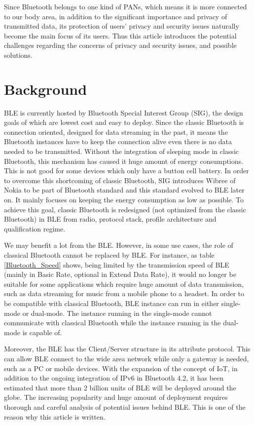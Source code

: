 \documentclass{cseminar}
\begin{document}
Since Bluetooth belongs to one kind of PANs, which means it is more connected to our body area, in addition to the significant importance and privacy of transmitted data, its protection of users' privacy and security issues naturally become the main focus of its users. Thus this article introduces the potential challenges regarding the concerns of privacy and security issues, and possible solutions.


\section{Background}
BLE is currently hosted by Bluetooth Special Interest Group (SIG), the design goals of which are lowest cost and easy to deploy. Since the classic Bluetooth is connection oriented, designed for data streaming in the past, it means the Bluetooth instances have to keep the connection alive even there is no data needed to be transmitted. Without the integration of sleeping mode in classic Bluetooth, this mechanism has caused it huge amount of energy consumptions. This is not good for some devices which only have  a button cell battery. In order to overcome this shortcoming of classic Bluetooth, SIG introduces Wibree of Nokia to be part of Bluetooth standard and this standard evolved to BLE later on. It mainly focuses on keeping the energy consumption as low as possible. To achieve this goal, classic Bluetooth is redesigned (not optimized from the classic Bluetooth) in BLE from radio, protocol stack, profile architecture and qualification regime\cite{BLE02}.

We may benefit a lot from the BLE. However, in some use cases, the role of classical Bluetooth cannot be replaced by BLE. For instance, as table \ref{Bluetooth_Speed} shows, being limited by the transmission speed of BLE (mainly in Basic Rate, optional in Extend Data Rate), it would no longer be suitable for some applications which require huge amount of data transmission, such as data streaming for music from a mobile phone to a headset. In order to be compatible with classical Bluetooth, BLE instance can run in either single-mode or dual-mode. The instance running in the single-mode cannot communicate with classical Bluetooth while the instance running in the dual-mode is capable of.

Moreover, the BLE has the Client/Server structure in its attribute protocol. This can allow BLE connect to the wide area network while only a gateway is needed, such as a PC or mobile devices. With the expansion of the concept of IoT, in addition to the ongoing integration of IPv6 in Bluetooth 4.2, it has been estimated that more than 2 billion units of BLE will be deployed around the globe\cite{BLE01}. The increasing popularity and huge amount of deployment\cite{BLE04} requires thorough and careful analysis of potential issues behind BLE. This is one of the reason why this article is written.
\end{document}
